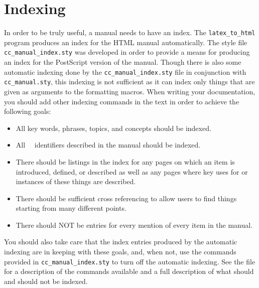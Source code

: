 \section{Indexing\label{sec:indexing}}

In order to be truly useful, a manual needs to have an index.  The
{\tt latex\_to\_html} program produces an index for the HTML manual
automatically.  %
The style file {\tt cc\_manual\_index.sty}%
 was developed in order to provide
a means for producing an index for the PostScript version of the manual.
Though there is also some automatic indexing done by the
{\tt cc\_manual\_index.sty} file in conjunction with {\tt cc\_manual.sty},
this indexing is not sufficient as it can index only things that are
given as arguments to the formatting macros.  When writing your
documentation, you should add other indexing commands in the text in
order to achieve the following goals:
\begin{itemize}
   \item All key words, phrases, topics, and concepts should be indexed.
   \item All \cgal\ \CC\ identifiers described in the manual should be indexed.
   \item There should be listings in the index for any pages on which an
         item is introduced, defined, or described as well as any pages
         where key uses for or instances of these things are described.
   \item There should be sufficient cross referencing to allow users
         to find things starting from many different points.
   \item There should NOT be entries for every mention of every item in the
         manual.
\end{itemize}

You should also take care that the index entries produced by the automatic
indexing are in keeping with these goals, and, when not, use the commands
provided in {\tt cc\_manual\_index.sty} to turn off the automatic indexing.
See the file 
for a description of the commands available and a full description of what
should and should not be indexed.



